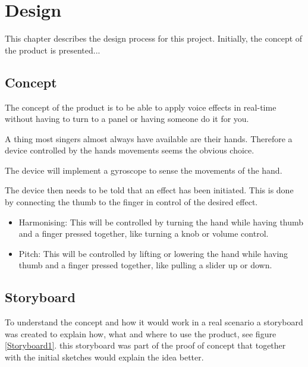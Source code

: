 \chapter{Design}
This chapter describes the design process for this project. Initially, the concept of the product is presented...

\section{Concept}
The concept of the product is to be able to apply voice effects in real-time without having to turn to a panel or having someone do it for you. 

A thing most singers almost always have available are their hands. Therefore a device controlled by the hands movements seems the obvious choice.

The device will implement a gyroscope to sense the movements of the hand.

The device then needs to be told that an effect has been initiated. This is done by connecting the thumb to the finger in control of the desired effect.


\begin{itemize}
\item Harmonising: This will be controlled by turning the hand while having thumb and a finger pressed together, like turning a knob or volume control.
\item Pitch: This will be controlled by lifting or lowering the hand while having thumb and a finger pressed together, like pulling a slider up or down.
\end{itemize}

\section{Storyboard}

To understand the concept and how it would work in a real scenario a storyboard was created to explain how, what and where to use the product, see figure \ref{Storyboard1}. this storyboard was part of the proof of concept that together with the initial sketches would explain the idea better.\\

\begin{minipage}{\linewidth}%
\label{Storyboard1}
\end{minipage}\\


